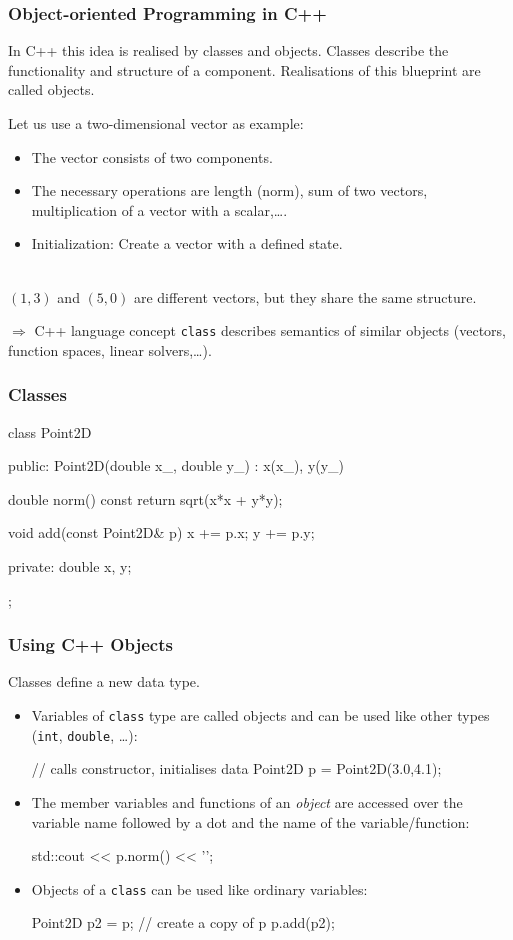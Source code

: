 \documentclass[aspectratio=169,ignorenonframetext,11pt]{beamer}
\def\inline{\lstinline[basicstyle=\small\ttfamily]}
\begin{document}
\begin{frame}
\frametitle{Object-oriented Programming in C++}
In C++ this idea is realised by classes and objects. Classes describe the functionality and structure of a component. Realisations of this blueprint are called objects. 

Let us use a two-dimensional vector as example:
\begin{itemize}
\item The vector consists of two components.
\item The necessary operations are length (norm), sum of two vectors, multiplication of a vector with a scalar,\dots.
\item Initialization: Create a vector with a defined state.
\end{itemize}\ \\
$(1,3)$ and $(5,0)$ are different vectors, but they share the same structure.\\
\pause
\begin{block}{$\Rightarrow$ C++ language concept}
\inline!class! describes semantics of similar objects (vectors, function spaces, linear solvers,\dots).
\end{block}
\end{frame}

\begin{frame}[fragile]
  \frametitle{Classes}
  \begin{cppcode}
class Point2D {
public:
  Point2D(double x_, double y_)
    : x(x_), y(y_)
  {}

  double norm() const {
    return sqrt(x*x + y*y);
  }

  void add(const Point2D& p) {
    x += p.x;
    y += p.y;
  }

private:
  double x, y;
};
  \end{cppcode}
\end{frame}

\begin{frame}[fragile]
  \frametitle{Using C++ Objects}
 Classes define a new data type. 
\begin{itemize}
  \item Variables of \inline!class! type are called objects and can be used like other types (\inline!int!, \inline!double!, \dots):
    \begin{cppcode}
      // calls constructor, initialises data
      Point2D p = Point2D(3.0,4.1); 
    \end{cppcode}
  \item The member variables and functions of an \emph{object} are accessed over the variable name followed by a dot and the name of the variable/function:
    \begin{cppcode}
      std::cout << p.norm() << '\n';
    \end{cppcode}
  \item Objects of a \inline!class! can be used like ordinary variables:
    \begin{cppcode}
      Point2D p2 = p; // create a copy of p
      p.add(p2);
    \end{cppcode}
  \end{itemize}
\end{frame}
\end{document}
